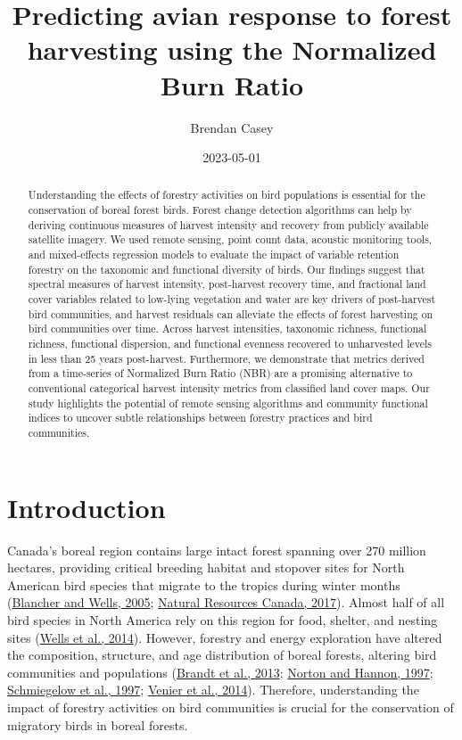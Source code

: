 \documentclass[
  12pt,
]{article}
\title{Predicting avian response to forest harvesting using the Normalized Burn Ratio}
\author{Brendan Casey}
\date{2023-05-01}
\begin{document}
\maketitle
\begin{abstract}
Understanding the effects of forestry activities on bird populations is essential for the conservation of boreal forest birds. Forest change detection algorithms can help by deriving continuous measures of harvest intensity and recovery from publicly available satellite imagery. We used remote sensing, point count data, acoustic monitoring tools, and mixed-effects regression models to evaluate the impact of variable retention forestry on the taxonomic and functional diversity of birds. Our findings suggest that spectral measures of harvest intensity, post-harvest recovery time, and fractional land cover variables related to low-lying vegetation and water are key drivers of post-harvest bird communities, and harvest residuals can alleviate the effects of forest harvesting on bird communities over time. Across harvest intensities, taxonomic richness, functional richness, functional dispersion, and functional evenness recovered to unharvested levels in less than 25 years post-harvest. Furthermore, we demonstrate that metrics derived from a time-series of Normalized Burn Ratio (NBR) are a promising alternative to conventional categorical harvest intensity metrics from classified land cover maps. Our study highlights the potential of remote sensing algorithms and community functional indices to uncover subtle relationships between forestry practices and bird communities.
\end{abstract}

{
\hypersetup{linkcolor=}
\setcounter{tocdepth}{2}
\tableofcontents
}
\hypertarget{introduction}{%
\section{Introduction}\label{introduction}}

Canada's boreal region contains large intact forest spanning over 270 million hectares, providing critical breeding habitat and stopover sites for North American bird species that migrate to the tropics during winter months (\protect\hyperlink{ref-Blancher2005}{Blancher and Wells, 2005}; \protect\hyperlink{ref-NaturalResourcesCanada2017}{Natural Resources Canada, 2017}). Almost half of all bird species in North America rely on this region for food, shelter, and nesting sites (\protect\hyperlink{ref-wells2014boreal}{Wells et al., 2014}). However, forestry and energy exploration have altered the composition, structure, and age distribution of boreal forests, altering bird communities and populations (\protect\hyperlink{ref-Brandt2013}{Brandt et al., 2013}; \protect\hyperlink{ref-nortonSongbirdResponsePartialcut1997}{Norton and Hannon, 1997}; \protect\hyperlink{ref-Schmiegelow1997}{Schmiegelow et al., 1997}; \protect\hyperlink{ref-Venier2014}{Venier et al., 2014}). Therefore, understanding the impact of forestry activities on bird communities is crucial for the conservation of migratory birds in boreal forests.
\end{document}

